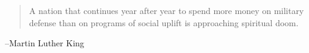 \documentclass{exam}
\begin{document}
  \else
    \vspace{11 cm}
    \begin{quote}
      \begin{em}
        A nation that continues year after year to spend more money on military defense than on programs of social
        uplift is approaching spiritual doom.
      \end{em}
    \end{quote}
    \hspace{1 cm} --Martin Luther King
  \fi
\end{document}
